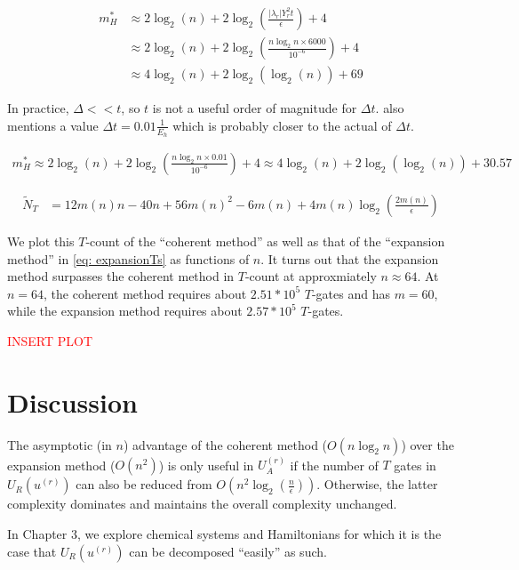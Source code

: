 \begin{equation}
    \begin{split}
        m^*_{H} &\approx 2\log_2(n) + 2\log_2\left(\frac{|\lambda_r|Y_r^2 t}{\epsilon}\right) + 4 \\
        &\approx 2\log_2(n) + 2\log_2\left(\frac{n\log_2{n}\times 6000}{10^{-6}}\right) + 4 \\
        &\approx 4\log_2(n) + 2\log_2(\log_2(n)) + 69
    \end{split}
\end{equation}

In practice, $\Delta << t$, so $t$ is not a useful order of magnitude for $\Delta t$. \cite{Gate_Count} also mentions a value $\Delta t = 0.01 \frac{1}{E_h}$ which is probably closer to the actual of $\Delta t$.

\begin{equation}
    \begin{split}
        m^*_{H} \approx 2\log_2(n) + 2\log_2\left(\frac{n\log_2{n}\times 0.01}{10^{-6}}\right) + 4 \approx 4\log_2(n) + 2\log_2(\log_2(n)) + 30.57
    \end{split}
\end{equation}

\begin{equation}
    \begin{split}
        \tilde{N}_{T} &= 12m(n)n - 40n + 56m(n)^2 - 6m(n) + 4m(n)\log_2(\frac{2m(n)}{\epsilon})
    \end{split}
\end{equation}

We plot this $T$-count of the ``coherent method'' as well as that of the ``expansion method'' in \eqref{eq: expansionTs} as functions of $n$. It turns out that the expansion method surpasses the coherent method in $T$-count at approxmiately $n \approx 64$. At $n = 64$, the coherent method requires about $2.51 * 10^5$ $T$-gates and has $m = 60$, while the expansion method requires about $2.57 * 10^5$ $T$-gates.

\textcolor{red}{INSERT PLOT}



\section{Discussion}

The asymptotic (in $n$) advantage of the coherent method ($O(n\log_2{n})$) over the expansion method ($O(n^2)$) is only useful in $U_A^{(r)}$ if the number of $T$ gates in $U_R(u^{(r)})$ can also be reduced from $O(n^2\log_2(\frac{n}{\epsilon}))$. Otherwise, the latter complexity dominates and maintains the overall complexity unchanged.

In Chapter 3, we explore chemical systems and Hamiltonians for which it is the case that $U_R(u^{(r)})$ can be decomposed ``easily'' as such.



